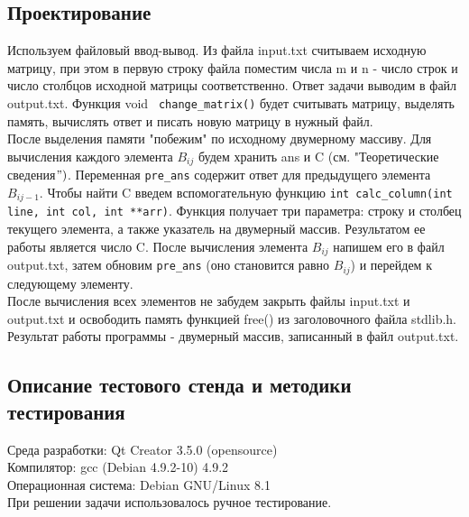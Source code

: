\documentclass[12pt,a4paper]{report}
\begin{document}
\subsection{Проектирование}
Используем файловый ввод-вывод. Из файла input.txt считываем исходную матрицу, при этом в первую строку файла поместим числа m и n - число строк и число столбцов исходной матрицы соответственно. Ответ задачи выводим в файл output.txt. Функция void \verb+ change_matrix()+ будет считывать матрицу, выделять память, вычислять ответ и писать новую матрицу в нужный файл. \\
После выделения памяти "побежим" по исходному двумерному массиву. Для вычисления каждого элемента $B_{i j}$ будем хранить ans и C (см. "Теоретические сведения$")$. Переменная \verb+pre_ans+ содержит ответ для предыдущего элемента $B_{i j-1}$. Чтобы найти C введем вспомогательную функцию \verb+int calc_column(int line, int col, int **arr)+. Функция получает три параметра: строку и столбец текущего элемента, а также указатель на двумерный массив. Результатом ее работы является число C. После вычисления элемента $B_{i j}$ напишем его в файл output.txt, затем обновим \verb+pre_ans+ (оно становится равно $B_{i j}$) и перейдем к следующему элементу. \\
После вычисления всех элементов не забудем закрыть файлы input.txt и output.txt и освободить память функцией free() из заголовочного файла stdlib.h. \\
Результат работы программы - двумерный массив, записанный в файл output.txt. 
\subsection{Описание тестового стенда и методики тестирования}
Среда разработки: Qt Creator 3.5.0 (opensource)\\
Компилятор: gcc (Debian 4.9.2-10) 4.9.2 \\
Операционная система: Debian GNU/Linux 8.1 \\
При решении задачи использовалось ручное тестирование. 
\end{document}
